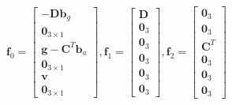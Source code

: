 \documentclass{article}
\begin{document}
\begin{equation}
    \textbf{f}_{0}=\left[\begin{array}{c}
        -\textbf{D}\textbf{b}_{g}\\\textbf{0}_{3\times 1}\\\textbf{g}-\textbf{C}^{T}\textbf{b}_{a}\\
        \textbf{0}_{3\times 1}\\\textbf{v}\\\textbf{0}_{3\times 1}
    \end{array}\right],
    \textbf{f}_{1}=\left[\begin{array}{c}
        \textbf{D}\\\textbf{0}_{3}\\\textbf{0}_{3}\\\textbf{0}_{3}\\\textbf{0}_{3}\\\textbf{0}_{3}
    \end{array}\right],
    \textbf{f}_{2}=\left[\begin{array}{c}
        \textbf{0}_{3}\\\textbf{0}_{3}\\\textbf{C}^{T}\\\textbf{0}_{3}\\\textbf{0}_{3}\\\textbf{0}_{3}
    \end{array}\right]
\end{equation}
\end{document}
